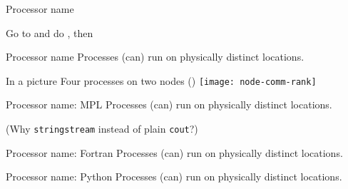 
 {Processor name}


\begin{exerciseframe}
  

  Go to  and do ,
  then 
\end{exerciseframe}

\begin{numberedframe}{Processor name}
  Processes (can) run on physically distinct locations.

\end{numberedframe}

\begin{numberedframe}{In a picture}
  Four processes on two nodes ()
  \texttt{[image: node-comm-rank]}
\end{numberedframe}

\begin{mpl}
  \addtocounter{slidecount}{-1}
\begin{numberedframe}[l]{Processor name: MPL}
  Processes (can) run on physically distinct locations.


  (Why \lstinline{stringstream} instead of plain \lstinline{cout}?)
\end{numberedframe}
\end{mpl}

\begin{fortran}
  \addtocounter{slidecount}{-1}
\begin{numberedframe}[f]{Processor name: Fortran}
  Processes (can) run on physically distinct locations.

\end{numberedframe}
\end{fortran}

\begin{python}
  \addtocounter{slidecount}{-1}
\begin{numberedframe}[p]{Processor name: Python}
  Processes (can) run on physically distinct locations.

\end{numberedframe}
\end{python}


